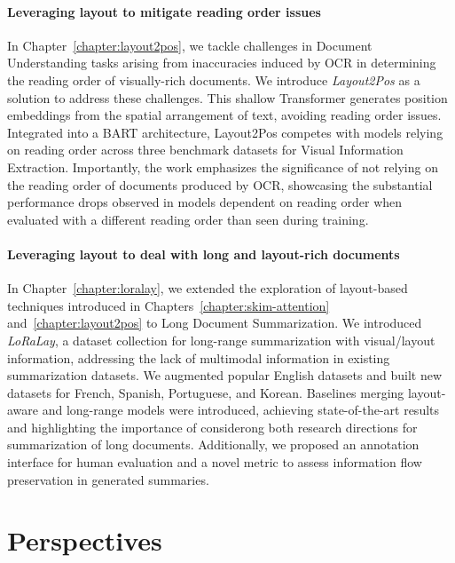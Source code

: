 \paragraph{Leveraging layout to mitigate reading order issues}

In Chapter~\ref{chapter:layout2pos}, we tackle challenges in Document Understanding tasks arising from inaccuracies induced by \ac{OCR} in determining the reading order of visually-rich documents. We introduce \textit{Layout2Pos} as a solution to address these challenges. This shallow Transformer generates position embeddings from the spatial arrangement of text, avoiding reading order issues. Integrated into a BART architecture, Layout2Pos competes with models relying on reading order across three benchmark datasets for Visual Information Extraction. Importantly, the work emphasizes the significance of not relying on the reading order of documents produced by \ac{OCR}, showcasing the substantial performance drops observed in models dependent on reading order when evaluated with a different reading order than seen during training.

\paragraph{Leveraging layout to deal with long and layout-rich documents}

In Chapter~\ref{chapter:loralay}, we extended the exploration of layout-based techniques introduced in Chapters~\ref{chapter:skim-attention} and~\ref{chapter:layout2pos} to Long Document Summarization. We introduced \textit{LoRaLay}, a dataset collection for long-range summarization with visual/layout information, addressing the lack of multimodal information in existing summarization datasets. We augmented popular English datasets and built new datasets for French, Spanish, Portuguese, and Korean. Baselines merging layout-aware and long-range models were introduced, achieving state-of-the-art results and highlighting the importance of considerong both research directions for summarization of long documents. Additionally, we proposed an annotation interface for human evaluation and a novel metric to assess information flow preservation in generated summaries.


\section{Perspectives}